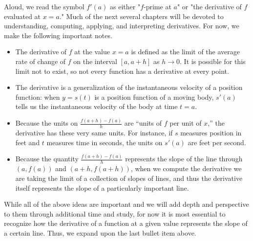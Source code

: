 Aloud, we read the symbol $f'(a)$ as either "$f$-prime at $a$" or "the derivative of $f$ evaluated at $x = a$."  Much of the next several chapters will be devoted to understanding, computing, applying, and interpreting derivatives.  For now, we make the following important notes.
\begin{itemize}
	\item The derivative of $f$ at the value $x = a$ is defined as the limit of the average rate of change of $f$ on the interval $[a,a+h]$ as $h \to 0$.  It is possible for this limit not to exist, so not every function has a derivative at every point.
	\item The derivative is a generalization of the instantaneous velocity of a position function:  when $y = s(t)$ is a position function of a moving body, $s'(a)$ tells us the instantaneous velocity of the body at time $t=a$.
	\item Because the units on $\frac{f(a+h)-f(a)}{h}$ are ``units of $f$ per unit of $x$,'' the derivative has these very same units.  For instance, if $s$ measures position in feet and $t$ measures time in seconds, the units on $s'(a)$ are feet per second. 
	\item Because the quantity $\frac{f(a+h)-f(a)}{h}$ represents the slope of the line through $(a,f(a))$ and $(a+h, f(a+h))$, when we compute the derivative we are taking the limit of a collection of slopes of lines, and thus the derivative itself represents the slope of a particularly important line.
\end{itemize}
While all of the above ideas are important and we will add depth and perspective to them through additional time and study, for now it is most essential to recognize how the derivative of a function at a given value represents the slope of a certain line.  Thus, we expand upon the last bullet item above.

